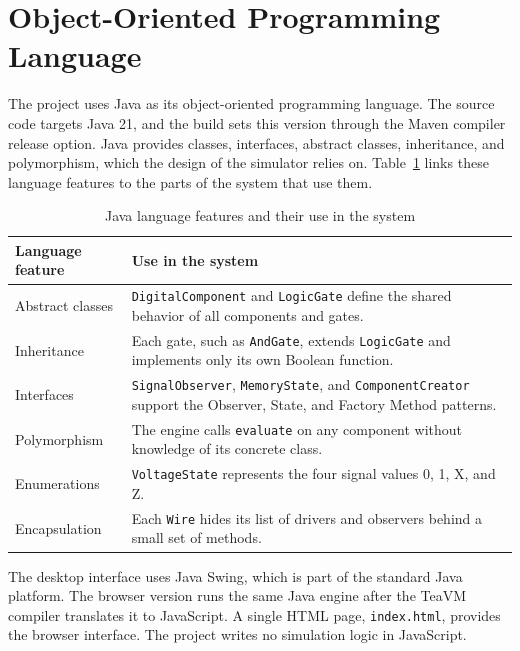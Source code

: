 \section{Object-Oriented Programming Language}

The project uses Java as its object-oriented programming language.
The source code targets Java 21, and the build sets this version through the Maven compiler release option.
Java provides classes, interfaces, abstract classes, inheritance, and polymorphism, which the design of the simulator relies on.
Table~\ref{tab:oo} links these language features to the parts of the system that use them.

\begin{table}[H]
\centering
\small
\caption{Java language features and their use in the system}
\label{tab:oo}
\begin{tabular}{>{\raggedright\arraybackslash}p{4.2cm}>{\raggedright\arraybackslash}p{10.8cm}}
\toprule
\textbf{Language feature} & \textbf{Use in the system} \\
\midrule
Abstract classes & \texttt{DigitalComponent} and \texttt{LogicGate} define the shared behavior of all components and gates. \\
Inheritance & Each gate, such as \texttt{AndGate}, extends \texttt{LogicGate} and implements only its own Boolean function. \\
Interfaces & \texttt{SignalObserver}, \texttt{MemoryState}, and \texttt{ComponentCreator} support the Observer, State, and Factory Method patterns. \\
Polymorphism & The engine calls \texttt{evaluate} on any component without knowledge of its concrete class. \\
Enumerations & \texttt{VoltageState} represents the four signal values 0, 1, X, and Z. \\
Encapsulation & Each \texttt{Wire} hides its list of drivers and observers behind a small set of methods. \\
\bottomrule
\end{tabular}
\end{table}

The desktop interface uses Java Swing, which is part of the standard Java platform.
The browser version runs the same Java engine after the TeaVM compiler translates it to JavaScript.
A single HTML page, \texttt{index.html}, provides the browser interface.
The project writes no simulation logic in JavaScript.

